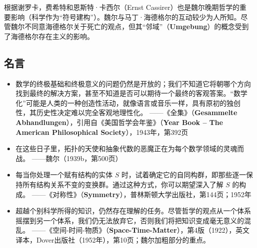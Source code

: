 根据谢罗卡，费希特和恩斯特·卡西尔（Ernst Cassirer）也是魏尔晚期哲学的重要影响（科学作为“符号建构”）。魏尔与马丁·海德格尔的互动较少为人所知。尽管魏尔不同意海德格尔关于死亡的观点，但其“邻域”（\textbf{Umgebung}）的概念受到了海德格尔存在主义的影响。
\subsection{名言}  
\begin{itemize}
\item 数学的终极基础和终极意义的问题仍然是开放的；我们不知道它将朝哪个方向找到最终的解决方案，甚至不知道是否可以期待一个最终的客观答案。“数学化”可能是人类的一种创造性活动，就像语言或音乐一样，具有原初的独创性，其历史性决定难以完全客观地理性化。  
——《全集》（\textbf{Gesammelte Abhandlungen}），引用自《美国哲学会年鉴》（\textbf{Year Book – The American Philosophical Society}），1943年，第392页  
\item 在这些日子里，拓扑的天使和抽象代数的恶魔正在为每个数学领域的灵魂而战。  
——魏尔（1939b，第500页）  
\item 每当你处理一个赋有结构的实体 \( S \) 时，试着确定它的自同构群，即那些逐一保持所有结构关系不变的变换群。通过这种方式，你可以期望深入了解 \( S \) 的构成。  
——《对称性》（\textbf{Symmetry}），普林斯顿大学出版社，第144页；1952年  
\item 超越个别科学所得的知识，仍然存在理解的任务。尽管哲学的观点从一个体系摇摆到另一个体系，我们仍无法放弃它，否则我们将把知识变成毫无意义的混乱。  
——《空间-时间-物质》（\textbf{Space-Time-Matter}），第4版（1922），英文译本，Dover出版社（1952年），第10页；魏尔加粗部分的重点。
\end{itemize}  
